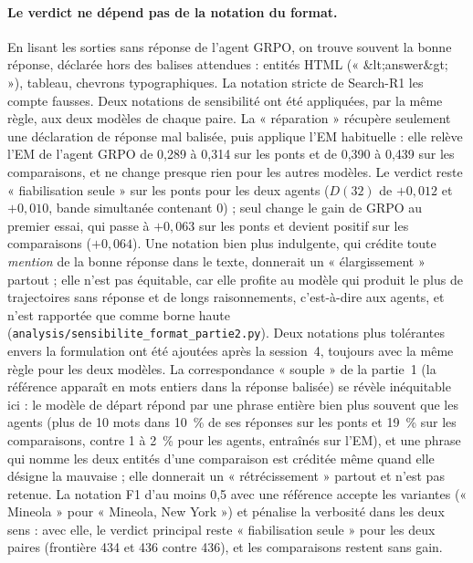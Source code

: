 \paragraph{Le verdict ne dépend pas de la notation du format.} En lisant les sorties sans réponse de l'agent GRPO, on trouve souvent la bonne réponse, déclarée hors des balises attendues : entités HTML (« \&lt;answer\&gt; »), tableau, chevrons typographiques. La notation stricte de Search-R1 les compte fausses. Deux notations de sensibilité ont été appliquées, par la même règle, aux deux modèles de chaque paire. La « réparation » récupère seulement une déclaration de réponse mal balisée, puis applique l'EM habituelle : elle relève l'EM de l'agent GRPO de 0,289 à 0,314 sur les ponts et de 0,390 à 0,439 sur les comparaisons, et ne change presque rien pour les autres modèles. Le verdict reste « fiabilisation seule » sur les ponts pour les deux agents ($D(32)$ de $+0{,}012$ et $+0{,}010$, bande simultanée contenant 0) ; seul change le gain de GRPO au premier essai, qui passe à $+0{,}063$ sur les ponts et devient positif sur les comparaisons ($+0{,}064$). Une notation bien plus indulgente, qui crédite toute \emph{mention} de la bonne réponse dans le texte, donnerait un « élargissement » partout ; elle n'est pas équitable, car elle profite au modèle qui produit le plus de trajectoires sans réponse et de longs raisonnements, c'est-à-dire aux agents, et n'est rapportée que comme borne haute (\texttt{analysis/sensibilite\_format\_partie2.py}). Deux notations plus tolérantes envers la formulation ont été ajoutées après la session~4, toujours avec la même règle pour les deux modèles. La correspondance « souple » de la partie~1 (la référence apparaît en mots entiers dans la réponse balisée) se révèle inéquitable ici : le modèle de départ répond par une phrase entière bien plus souvent que les agents (plus de 10 mots dans 10~\% de ses réponses sur les ponts et 19~\% sur les comparaisons, contre 1 à 2~\% pour les agents, entraînés sur l'EM), et une phrase qui nomme les deux entités d'une comparaison est créditée même quand elle désigne la mauvaise ; elle donnerait un « rétrécissement » partout et n'est pas retenue. La notation F1 d'au moins 0,5 avec une référence accepte les variantes (« Mineola » pour « Mineola, New York ») et pénalise la verbosité dans les deux sens : avec elle, le verdict principal reste « fiabilisation seule » pour les deux paires (frontière 434 et 436 contre 436), et les comparaisons restent sans gain.

